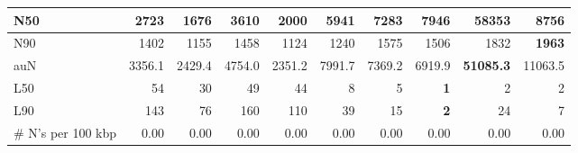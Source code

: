 \documentclass[12pt,a4paper]{article}
\begin{document}
\begin{table}[ht]
\begin{center}
\begin{tabular}{|l*{9}{|r}|}
N50 & 2723 & 1676 & 3610 & 2000 & 5941 & 7283 & 7946 & {\bf 58353} & 8756 \\ \hline
N90 & 1402 & 1155 & 1458 & 1124 & 1240 & 1575 & 1506 & 1832 & {\bf 1963} \\ \hline
auN & 3356.1 & 2429.4 & 4754.0 & 2351.2 & 7991.7 & 7369.2 & 6919.9 & {\bf 51085.3} & 11063.5 \\ \hline
L50 & 54 & 30 & 49 & 44 & 8 & 5 & {\bf 1} & 2 & 2 \\ \hline
L90 & 143 & 76 & 160 & 110 & 39 & 15 & {\bf 2} & 24 & 7 \\ \hline
\# N's per 100 kbp & 0.00 & 0.00 & 0.00 & 0.00 & 0.00 & 0.00 & 0.00 & 0.00 & 0.00 \\ \hline
\end{tabular}
\end{center}
\end{table}
\end{document}
